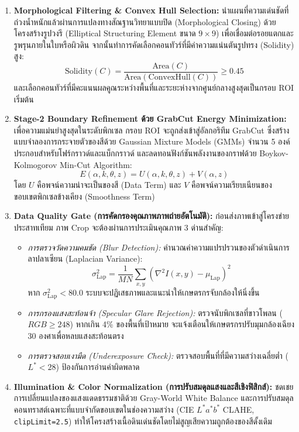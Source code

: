 \begin{enumerate}
    \item \textbf{Morphological Filtering \& Convex Hull Selection:}
    นำแผนที่ความเด่นชัดที่ถ่วงน้ำหนักแล้วผ่านการแปลงทางสัณฐานวิทยาแบบปิด (Morphological Closing) ด้วยโครงสร้างรูปวงรี (Elliptical Structuring Element ขนาด $9 \times 9$) เพื่อเชื่อมต่อรอยแตกและรูพรุนภายในใบหรือผิวดิน จากนั้นทำการคัดเลือกคอนทัวร์ที่มีค่าความแน่นตันรูปทรง (Solidity) สูง:
    \begin{equation}
        \text{Solidity}(C) = \frac{\text{Area}(C)}{\text{Area}(\text{ConvexHull}(C))} \ge 0.45
    \end{equation}
    และเลือกคอนทัวร์ที่มีคะแนนผลคูณระหว่างพื้นที่และระยะห่างจากศูนย์กลางสูงสุดเป็นกรอบ ROI เริ่มต้น

    \item \textbf{Stage-2 Boundary Refinement ด้วย GrabCut Energy Minimization:}
    เพื่อความแม่นยำสูงสุดในระดับพิกเซล กรอบ ROI จะถูกส่งเข้าสู่อัลกอริทึม GrabCut ซึ่งสร้างแบบจำลองการกระจายตัวของสีด้วย Gaussian Mixture Models (GMMs) จำนวน 5 องค์ประกอบสำหรับโฟร์กราวด์และแบ็กกราวด์ และลดทอนฟังก์ชันพลังงานของกราฟด้วย Boykov-Kolmogorov Min-Cut Algorithm:
    \begin{equation}
        E(\alpha, k, \theta, z) = U(\alpha, k, \theta, z) + V(\alpha, z)
    \end{equation}
    โดย $U$ คือพจน์ความน่าจะเป็นของสี (Data Term) และ $V$ คือพจน์ความเรียบเนียนของขอบเขตพิกเซลข้างเคียง (Smoothness Term)

    \item \textbf{Data Quality Gate (การคัดกรองคุณภาพภาพถ่ายอัตโนมัติ):}
    ก่อนส่งภาพเข้าสู่โครงข่ายประสาทเทียม ภาพ Crop จะต้องผ่านการประเมินคุณภาพ 3 ด่านสำคัญ:
    \begin{itemize}
        \item \textit{การตรวจวัดความคมชัด (Blur Detection):} คำนวณค่าความแปรปรวนของตัวดำเนินการลาปลาเซียน (Laplacian Variance):
        \begin{equation}
            \sigma^2_\text{Lap} = \frac{1}{MN} \sum_{x,y} \left( \nabla^2 I(x, y) - \mu_\text{Lap} \right)^2
        \end{equation}
        หาก $\sigma^2_\text{Lap} < 80.0$ ระบบจะปฏิเสธภาพและแนะนำให้เกษตรกรจับกล้องให้นิ่งขึ้น
        \item \textit{การกรองแสงสะท้อนจ้า (Specular Glare Rejection):} ตรวจนับพิกเซลที่ขาวโพลน ($RGB \ge 248$) หากเกิน 4\% ของพื้นที่เป้าหมาย จะแจ้งเตือนให้เกษตรกรปรับมุมกล้องเฉียง 30 องศาเพื่อหลบแสงสะท้อนตรง
        \item \textit{การตรวจสอบเงามืด (Underexposure Check):} ตรวจสอบพื้นที่ที่มีความสว่างเฉลี่ยต่ำ ($L^* < 28$) ป้องกันการอ่านค่าผิดพลาด
    \end{itemize}

    \item \textbf{Illumination \& Color Normalization (การปรับสมดุลแสงและสีเชิงฟิสิกส์):}
    ชดเชยการเปลี่ยนแปลงของแสงแดดธรรมชาติด้วย Gray-World White Balance และการปรับสมดุลคอนทราสต์เฉพาะที่แบบจำกัดขอบเขตในช่องความสว่าง (CIE $L^*a^*b^*$ CLAHE, \texttt{clipLimit=2.5}) ทำให้โครงสร้างเนื้อดินเด่นชัดโดยไม่สูญเสียความถูกต้องของสีดั้งเดิม
\end{enumerate}

